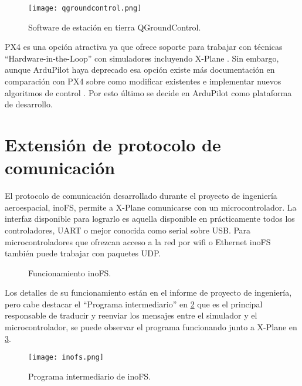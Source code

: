 \begin{figure}[h]
    \centering
    \texttt{[image: qgroundcontrol.png]}
    \caption[Software de estación en tierra QGroundControl.]{Software de estación en tierra QGroundControl.\footnotemark}
    \label{fig:qgroundcontrol}
\end{figure}

PX4 es una opción atractiva ya que ofrece soporte para trabajar con técnicas ``Hardware-in-the-Loop'' con simuladores incluyendo X-Plane \cite{px4-hitl}. Sin embargo, aunque ArduPilot haya deprecado esa opción \cite{ap-hitl} existe más documentación en comparación con PX4 sobre como modificar existentes e implementar nuevos algoritmos de control \cite{ap-custom-controller}. Por esto último se decide en ArduPilot como plataforma de desarrollo.

\section{Extensión de protocolo de comunicación}

El protocolo de comunicación desarrollado durante el proyecto de ingeniería aeroespacial, inoFS, permite a X-Plane comunicarse con un microcontrolador. La interfaz disponible para lograrlo es aquella disponible en prácticamente todos los controladores, UART o mejor conocida como serial sobre USB. Para microcontroladores que ofrezcan acceso a la red por wifi o Ethernet inoFS también puede trabajar con paquetes UDP.

\begin{figure}[h]
    \centering
    
    \caption{Funcionamiento inoFS.}
    \label{fig:inofs-diagrama}
\end{figure}

Los detalles de su funcionamiento están en el informe de proyecto de ingeniería, pero cabe destacar el ``Programa intermediario'' en \cref{fig:inofs-diagrama} que es el principal responsable de traducir y reenviar los mensajes entre el simulador y el microcontrolador, se puede observar el programa funcionando junto a X-Plane en \cref{fig:inofs-programa-intermediario}.

\begin{figure}[h]
    \centering
    \texttt{[image: inofs.png]}
    \caption{Programa intermediario de inoFS.}
    \label{fig:inofs-programa-intermediario}
\end{figure}

